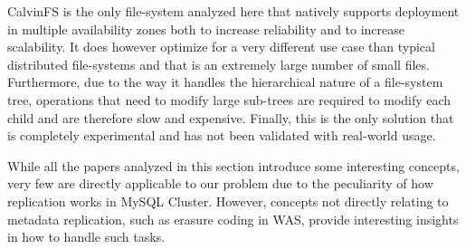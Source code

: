 CalvinFS is the only file-system analyzed here that natively supports deployment in multiple availability zones both to increase reliability and to increase scalability.
It does however optimize for a very different use case than typical distributed file-systems and that is an extremely large number of small files.
Furthermore, due to the way it handles the hierarchical nature of a file-system tree, operations that need to modify large sub-trees are required to modify each child and are therefore slow and expensive.
Finally, this is the only solution that is completely experimental and has not been validated with real-world usage.

While all the papers analyzed in this section introduce some interesting concepts, very few are directly applicable to our problem due to the peculiarity of how replication works in MySQL Cluster.
However, concepts not directly relating to metadata replication, such as erasure coding in WAS, provide interesting insights in how to handle such tasks.